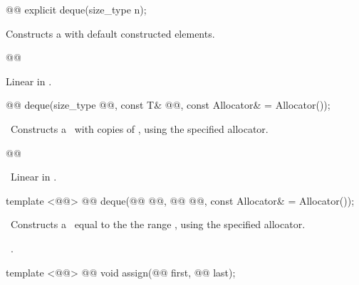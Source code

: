 \documentclass[american,twoside]{book}
\begin{document}
\begin{itemdecl}
@@ explicit deque(size_type n);
\end{itemdecl}

\begin{itemdescr}
\pnum
\effects Constructs a  with
 default constructed elements.

\pnum
@@

\pnum
\complexity Linear in .
\end{itemdescr}

\begin{itemdecl}
@@
deque(size_type @@, const T& @@,
      const Allocator& = Allocator());
\end{itemdecl}

\begin{itemdescr}
\pnum
\effects\ 
Constructs a
\
with  copies of ,
using the specified allocator.

\pnum
@@

\pnum
\complexity\ 
Linear in .
\end{itemdescr}

\begin{itemdecl}
template <@@>
  @@
  deque(@@ @@, @@ @@,
        const Allocator& = Allocator());
\end{itemdecl}

\begin{itemdescr}
\pnum
\effects\ 
Constructs a
\
equal to the the range
,
using the specified allocator.

\pnum
\complexity\ 
.
\end{itemdescr}

%
\begin{itemdecl}
template <@@>
  @@
  void assign(@@ first, @@ last);
\end{itemdecl}
\end{document}
